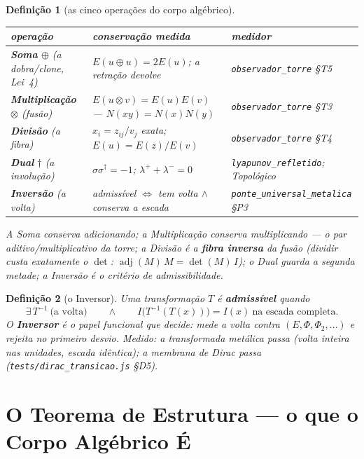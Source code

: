 \documentclass[11pt,a4paper]{article}
\newtheorem{definicao}{Definição}
\newcommand{\code}[1]{\texttt{\small #1}}
\begin{document}
\begin{definicao}[as cinco operações do corpo algébrico]\label{def:cinco}
\begin{center}\small
\begin{tabular}{@{}lll@{}}
\toprule
operação & conservação medida & medidor \\
\midrule
\textbf{Soma} $\oplus$ (a dobra/clone, Lei~4) & $E(u\oplus u)=2E(u)$; a retração devolve & \code{observador\_torre} \S T5 \\
\textbf{Multiplicação} $\otimes$ (fusão) & $E(u\otimes v)=E(u)E(v)$ --- $N(xy)=N(x)N(y)$ & \code{observador\_torre} \S T3 \\
\textbf{Divisão} (a fibra) & $x_i=z_{ij}/v_j$ exata; $E(u)=E(z)/E(v)$ & \code{observador\_torre} \S T4 \\
\textbf{Dual} $\dagger$ (a involução) & $\sigma\sigma^{\dagger}=-1$; $\lambda^{+}+\lambda^{-}=0$ & \code{lyapunov\_refletido}; \emph{Topológico} \\
\textbf{Inversão} (a volta) & admissível $\iff$ tem volta $\wedge$ conserva a escada & \code{ponte\_universal\_metalica} \S P3 \\
\bottomrule
\end{tabular}
\end{center}
A Soma conserva \emph{adicionando}; a Multiplicação conserva
\emph{multiplicando} --- o par aditivo/multiplicativo da torre; a
Divisão é a \textbf{fibra inversa} da fusão (dividir custa exatamente o
$\det$: $\operatorname{adj}(M)\,M=\det(M)\,I$); o Dual guarda a segunda
metade; a Inversão é o critério de admissibilidade.
\end{definicao}

\begin{definicao}[o Inversor]\label{def:inversor}
Uma transformação $T$ é \textbf{admissível} quando
\[
\boxed{
\exists\,T^{-1}\ \text{(a volta)}
\qquad\land\qquad
I\bigl(T^{-1}(T(x))\bigr)=I(x)\ \text{na escada completa}.
}
\]
O \textbf{Inversor} é o papel funcional que decide: mede a volta contra
$(E,\Phi,\Phi_2,\ldots)$ e rejeita no primeiro desvio. Medido: a
transformada metálica passa (volta inteira nas unidades, escada
idêntica); a membrana de Dirac passa
(\code{tests/dirac\_transicao.js} \S D5).
\end{definicao}

\section{O Teorema de Estrutura --- o que o Corpo Algébrico É}
\label{sec:estrutura}
\end{document}
